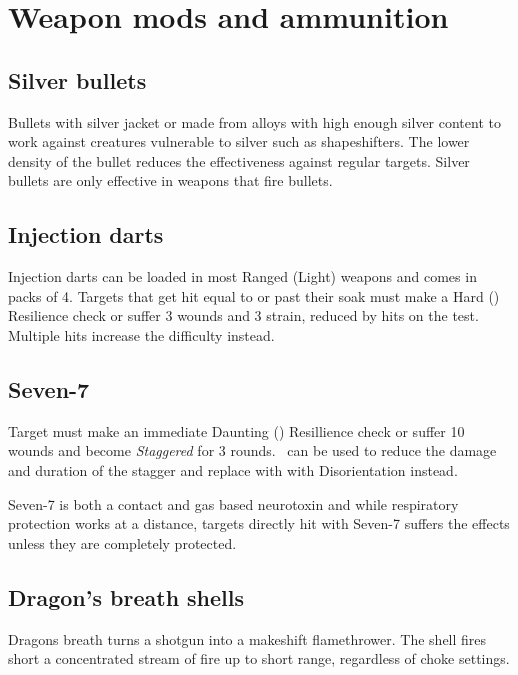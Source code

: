 \documentclass{book}
\begin{document}
\section{Weapon mods and ammunition}
\begin{multicols}{2}
	\subsection{Silver bullets}\label{silver}
	Bullets with silver jacket or made from alloys with high enough silver content to work against creatures vulnerable to silver such as shapeshifters. The lower density of the bullet reduces the effectiveness against regular targets. Silver bullets are only effective in weapons that fire bullets.
	
	\subsection{Injection darts}
	Injection darts can be loaded in most Ranged (Light) weapons and comes in packs of 4. Targets that get hit equal to or past their soak must make a Hard (\DifficultyDie \DifficultyDie \DifficultyDie) Resilience check or suffer 3 wounds and 3 strain, reduced by hits on the test. Multiple hits increase the difficulty instead.
	
	\subsection{Seven-7}
	Target must make an immediate Daunting (\DifficultyDie \DifficultyDie \DifficultyDie \DifficultyDie) Resillience check or suffer 10 wounds and become \textit{Staggered} for 3 rounds. \Advantage\ can be used to reduce the damage and duration of the stagger and replace with with Disorientation instead. 
	
	Seven-7 is both a contact and gas based neurotoxin and while respiratory protection works at a distance, targets directly hit with Seven-7 suffers the effects unless they are completely protected.
	
	\subsection{Dragon's breath shells}
	Dragons breath turns a shotgun into a makeshift flamethrower. The shell fires short a concentrated stream of fire up to short range, regardless of choke settings.
	
\end{multicols}
\end{document}
